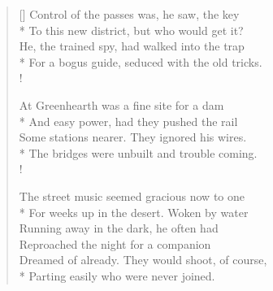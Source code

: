 \documentclass[MAIN]{subfiles}
\begin{document}
\settowidth{\versewidth}{Control of the passes was, he saw, the key}
\begin{verse}[\versewidth]
Control of the passes was, he saw, the key\\*
To this new district, but who would get it?\\
He, the trained spy, had walked into the trap\\*
For a bogus guide, seduced with the old tricks.\\!

At {\sc Greenhearth} was a fine site for a dam\\*
And easy power, had they pushed the rail\\
Some stations nearer. They ignored his wires.\\*
The bridges were unbuilt and trouble coming.\\!

The street music seemed gracious now to one\\*
For weeks up in the desert. Woken by water\\
Running away in the dark, he often had\\
Reproached the night for a companion\\
Dreamed of already. They would shoot, of course,\\*
Parting easily who were never joined.
\end{verse}
\end{document}
